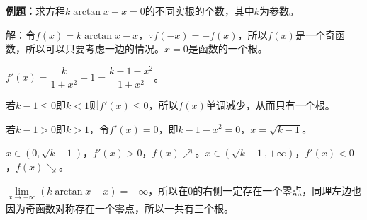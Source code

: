 \textbf{例题：}求方程$k\arctan x-x=0$的不同实根的个数，其中$k$为参数。

解：令$f(x)=k\arctan x-x$$，\because f(-x)=-f(x)$，所以$f(x)$是一个奇函数，所以可以只要考虑一边的情况。$x=0$是函数的一个根。

$f'(x)=\dfrac{k}{1+x^2}-1=\dfrac{k-1-x^2}{1+x^2}$。

若$k-1\leqslant0$即$k<1$则$f'(x)\leqslant0$，所以$f(x)$单调减少，从而只有一个根。

若$k-1>0$即$k>1$，令$f'(x)=0$，即$k-1-x^2=0$，$x=\sqrt{k-1}$。

$x\in(0,\sqrt{k-1})$，$f'(x)>0$，$f(x)\nearrow$。$x\in(\sqrt{k-1},+\infty)$，$f'(x)<0$，$f(x)\searrow$。

$\lim\limits_{x\to+\infty}(k\arctan x-x)=-\infty$，所以在0的右侧一定存在一个零点，同理左边也因为奇函数对称存在一个零点，所以一共有三个根。

